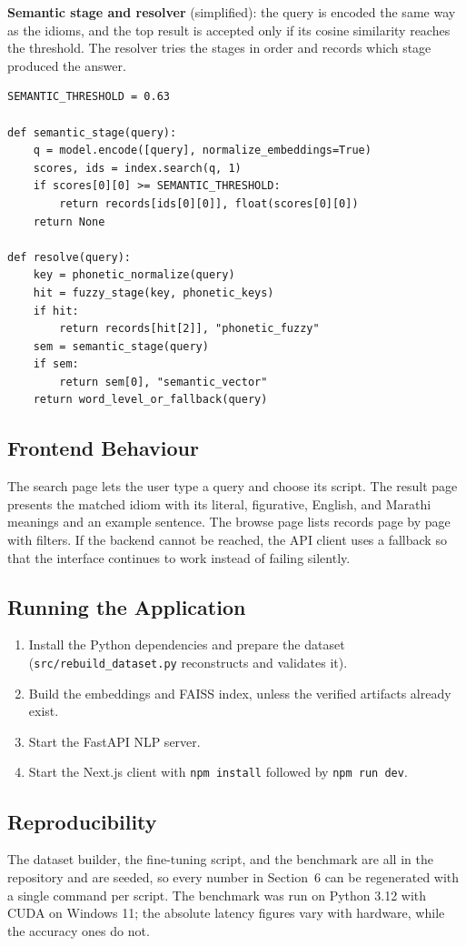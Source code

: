 \documentclass[12pt,a4paper]{article}
\begin{document}
\textbf{Semantic stage and resolver} (simplified): the query is encoded the same way as the idioms, and the top result is accepted only if its cosine similarity reaches the threshold. The resolver tries the stages in order and records which stage produced the answer.
\begin{lstlisting}
SEMANTIC_THRESHOLD = 0.63

def semantic_stage(query):
    q = model.encode([query], normalize_embeddings=True)
    scores, ids = index.search(q, 1)
    if scores[0][0] >= SEMANTIC_THRESHOLD:
        return records[ids[0][0]], float(scores[0][0])
    return None

def resolve(query):
    key = phonetic_normalize(query)
    hit = fuzzy_stage(key, phonetic_keys)
    if hit:
        return records[hit[2]], "phonetic_fuzzy"
    sem = semantic_stage(query)
    if sem:
        return sem[0], "semantic_vector"
    return word_level_or_fallback(query)
\end{lstlisting}

\subsection{Frontend Behaviour}
The search page lets the user type a query and choose its script. The result page presents the matched idiom with its literal, figurative, English, and Marathi meanings and an example sentence. The browse page lists records page by page with filters. If the backend cannot be reached, the API client uses a fallback so that the interface continues to work instead of failing silently.

\subsection{Running the Application}
\begin{enumerate}
  \item Install the Python dependencies and prepare the dataset (\texttt{src/rebuild\_dataset.py} reconstructs and validates it).
  \item Build the embeddings and FAISS index, unless the verified artifacts already exist.
  \item Start the FastAPI NLP server.
  \item Start the Next.js client with \texttt{npm install} followed by \texttt{npm run dev}.
\end{enumerate}

\subsection{Reproducibility}
The dataset builder, the fine-tuning script, and the benchmark are all in the repository and are seeded, so every number in Section~6 can be regenerated with a single command per script. The benchmark was run on Python 3.12 with CUDA on Windows 11; the absolute latency figures vary with hardware, while the accuracy ones do not.
\end{document}

